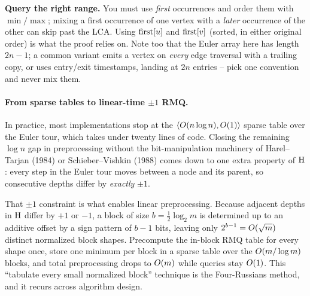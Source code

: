 \begin{trapbox}
\textbf{Query the right range.} You must use \emph{first} occurrences and order them with
$\min/\max$; mixing a first occurrence of one vertex with a \emph{later} occurrence of the
other can skip past the LCA. Using $\mathrm{first}[u]$ and $\mathrm{first}[v]$ (sorted, in either original order)
is what the proof relies on. Note too that the Euler array here has length $2n-1$; a common
variant emits a vertex on \emph{every} edge traversal with a trailing copy, or uses
entry/exit timestamps, landing at $2n$ entries -- pick one convention and never mix them.
\end{trapbox}

\paragraph{From sparse tables to linear-time $\pm 1$ RMQ.}
In practice, most implementations stop at the $\langle O(n\log n),O(1)\rangle$ sparse table over the Euler tour, which takes under twenty lines of code. Closing the remaining $\log n$ gap in preprocessing without the bit-manipulation machinery of Harel--Tarjan (1984) or Schieber--Vishkin (1988) comes down to one extra property of $\mathrm{H}$: every step in the Euler tour moves between a node and its parent, so consecutive depths differ by \emph{exactly} $\pm 1$.

\begin{aestheticbox}
That $\pm1$ constraint is what enables linear preprocessing. Because adjacent depths in $\mathrm{H}$
differ by $+1$ or $-1$, a block of size $b=\tfrac12\log_2 m$ is determined up to an additive offset
by a sign pattern of $b-1$ bits, leaving only $2^{b-1}=O(\sqrt m)$ distinct normalized block
shapes. Precompute the in-block RMQ table for every shape once, store one minimum per block
in a sparse table over the $O(m/\log m)$ blocks, and total preprocessing drops to
$O(m)$ while queries stay $O(1)$. This ``tabulate every small normalized block'' technique is
the Four-Russians method, and it recurs across algorithm design.
\end{aestheticbox}

